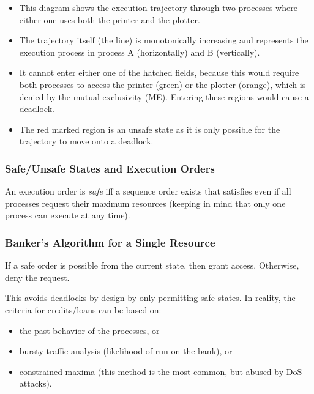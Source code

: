 	            \begin{itemize}
	            	\item This diagram shows the execution trajectory through two processes where either one uses both the printer and the plotter.
	            	\item The trajectory itself (the  line) is monotonically increasing and represents the execution process in process A (horizontally) and B (vertically).
	            	\item It cannot enter either one of the hatched fields, because this would require both processes to access the printer (green) or the plotter (orange), which is denied by the mutual exclusivity (ME). Entering these regions would cause a deadlock.
	            	\item The red marked region is an unsafe state as it is only possible for the trajectory to move onto a deadlock.
	            \end{itemize}
            
            \subsubsection{Safe/Unsafe States and Execution Orders}
				An execution order is \textit{safe} iff a sequence order exists that satisfies even if all processes request their maximum resources (keeping in mind that only one process can execute at any time).

            \subsubsection{Banker's Algorithm for a Single Resource}
                If a safe order is possible from the current state, then grant access. Otherwise, deny the request.
                
                This avoids deadlocks by design by only permitting safe states. In reality, the criteria for credits/loans can be based on:
                \begin{itemize}
                	\item the past behavior of the processes, or
                	\item bursty traffic analysis (likelihood of run on the bank), or
                	\item constrained maxima (this method is the most common, but abused by DoS attacks).
                \end{itemize}

